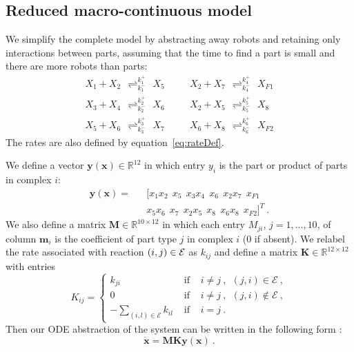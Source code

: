 \subsection{Reduced macro-continuous model} %
\label{sub:simple_macro_continuous_model}
    We simplify the complete model by abstracting away robots and retaining
    only interactions between parts, assuming that the time to find a
part is small and there are more robots than parts:
    \begin{eqnarray}
        X_1 + X_2 ~~{\mathop{\rightleftharpoons}_{k_1^-}^{k_1^+}}~~ X_5 & \quad &  X_2 + X_7 ~~{\mathop{\rightleftharpoons}_{k_4^-}^{k_4^+}}~~ X_{F1} \nonumber \\
        X_3 + X_4 ~~{\mathop{\rightleftharpoons}_{k_2^-}^{k_2^+}}~~ X_6 & & X_2 + X_5 ~~{\mathop{\rightleftharpoons}_{k_5^-}^{k_5^+}}~~ X_8 \nonumber \\
        X_5 + X_6 ~~{\mathop{\rightleftharpoons}_{k_3^-}^{k_3^+}}~~ X_7 & & X_6 + X_8 ~~{\mathop{\rightleftharpoons}_{k_6^-}^{k_6^+}}~~ X_{F2}
        \label{eq:reduced_macro_continuous}
    \end{eqnarray}
    The rates are also defined by
    equation~\eqref{eq:rateDef}.


We define a vector $\mathbf{y(x)} \in \mathbb{R}^{12}$ in which
entry $y_i$ is the part or product of parts in complex $i$:
\begin{eqnarray} \mathbf{y(x)} = && [x_1
x_2~~x_5 ~~x_3 x_4 ~~x_6 ~~x_2 x_7 ~~x_{F1} \nonumber \\  && x_5
x_6~~ x_7~~x_2 x_5 ~~x_8~~ x_6 x_8 ~~x_{F2}]^T~. \label{eq:ydef1}
\end{eqnarray}
We also define a matrix $\mathbf{M} \in \mathbb{R}^{10 \times 12}$
in which each entry $M_{ji}$, $j=1,...,10$, of column $\mathbf{m}_i$
is the coefficient of part type $j$ in complex $i$ ($0$ if absent).
We relabel the rate associated with reaction $(i,j) \in \cal{E}$ as
$k_{ij}$ and define a matrix $\mathbf{K} \in \mathbb{R}^{12 \times
12}$ with entries
\begin{equation}
K_{ij} =  \left\{
\begin{array}{lll}
k_{ji} &\mbox{ if }& i \neq j~, ~~(j,i) \in \mathcal{E}~, \\
0 &\mbox{ if }& i \neq j~, ~~(j,i) \notin \mathcal{E}~,\\
-\sum_{(i,l)\in {\mathcal E}} k_{il} &\mbox{ if }& i=j~.
\end{array} \right. \label{eq:Kdef}
\end{equation}
Then our ODE abstraction of the system can be written in the
following form \cite{Chaves:2004p11839}:
\begin{equation}
\mathbf{\dot{x}} = \mathbf{M}\mathbf{K}\mathbf{y}(\mathbf{x})~.
\label{eq:matrixODE}
\end{equation}

